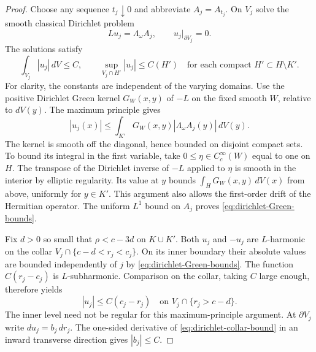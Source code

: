 \documentclass[11pt]{amsart}
\theoremstyle{remark}
\numberwithin{equation}{section}
\begin{document}
\begin{proof}
Choose any sequence $t_j\downarrow0$ and abbreviate $A_j=A_{t_j}$.
On $V_j$ solve the smooth classical Dirichlet problem
\[
 Lu_j=\Lambda_\omega A_j,\qquad u_j|_{\partial V_j}=0.
\]
The solutions satisfy
\begin{equation}\label{eq:dirichlet-Green-bounds}
 \int_{V_j}|u_j|\,dV\le C,\qquad
 \sup_{V_j\cap H'}|u_j|\le C(H')
 \quad\text{for each compact }H'\subset H\setminus K'.
\end{equation}
For clarity, the constants are independent of the varying domains.
Use the positive Dirichlet Green kernel $G_W(x,y)$ of $-L$ on the
fixed smooth $W$, relative to $dV(y)$. The maximum principle gives
\[
 |u_j(x)|\le\int_{K'} G_W(x,y)|\Lambda_\omega A_j(y)|\,dV(y).
\]
The kernel is smooth off the diagonal, hence bounded on disjoint
compact sets. To bound its integral in the first variable, take
$0\leq\eta\in C_c^\infty(W)$ equal to one on $H$. The transpose of
the Dirichlet inverse of $-L$ applied to $\eta$ is smooth in the
interior by elliptic regularity. Its value at $y$ bounds
$\int_H G_W(x,y)\,dV(x)$ from above, uniformly for $y\in K'$.
This argument also allows the first-order drift of the Hermitian
operator. The uniform $L^1$ bound on $A_j$ proves
\eqref{eq:dirichlet-Green-bounds}.

Fix $d>0$ so small that $\rho<c-3d$ on $K\cup K'$.
Both $u_j$ and $-u_j$ are $L$-harmonic on the collar
$V_j\cap\{c-d<r_j<c_j\}$. On its inner boundary their absolute
values are bounded independently of $j$ by
\eqref{eq:dirichlet-Green-bounds}. The function $C(r_j-c_j)$ is
$L$-subharmonic. Comparison on the collar, taking $C$ large enough,
therefore yields
\begin{equation}\label{eq:dirichlet-collar-bound}
 |u_j|\le C(c_j-r_j) \quad\text{on }V_j\cap\{r_j>c-d\}.
\end{equation}
The inner level need not be regular for this maximum-principle
argument. At $\partial V_j$ write $du_j=b_j\,dr_j$.
The one-sided derivative of \eqref{eq:dirichlet-collar-bound} in an
inward transverse direction gives $|b_j|\le C$.


\end{proof}
\end{document}
